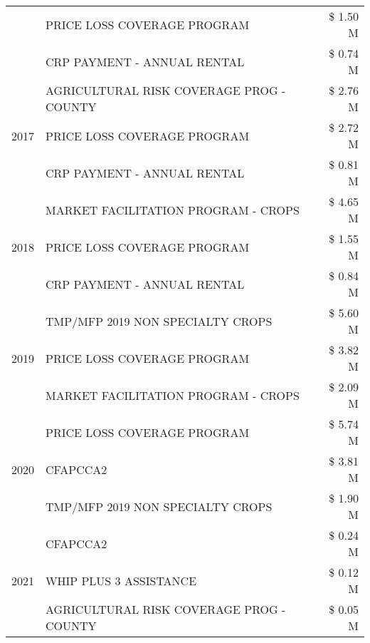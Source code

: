 \begin{tabular}{llr}
 & PRICE LOSS COVERAGE PROGRAM & \$ 1.50 M \\
 & CRP PAYMENT - ANNUAL RENTAL & \$ 0.74 M \\
\cline{1-3}
\multirow[t]{3}{*}{2017} & AGRICULTURAL RISK COVERAGE PROG - COUNTY & \$ 2.76 M \\
 & PRICE LOSS COVERAGE PROGRAM & \$ 2.72 M \\
 & CRP PAYMENT - ANNUAL RENTAL & \$ 0.81 M \\
\cline{1-3}
\multirow[t]{3}{*}{2018} & MARKET FACILITATION PROGRAM - CROPS & \$ 4.65 M \\
 & PRICE LOSS COVERAGE PROGRAM & \$ 1.55 M \\
 & CRP PAYMENT - ANNUAL RENTAL & \$ 0.84 M \\
\cline{1-3}
\multirow[t]{3}{*}{2019} & TMP/MFP 2019 NON SPECIALTY CROPS & \$ 5.60 M \\
 & PRICE LOSS COVERAGE PROGRAM & \$ 3.82 M \\
 & MARKET FACILITATION PROGRAM - CROPS & \$ 2.09 M \\
\cline{1-3}
\multirow[t]{3}{*}{2020} & PRICE LOSS COVERAGE PROGRAM & \$ 5.74 M \\
 & CFAPCCA2 & \$ 3.81 M \\
 & TMP/MFP 2019 NON SPECIALTY CROPS & \$ 1.90 M \\
\cline{1-3}
\multirow[t]{3}{*}{2021} & CFAPCCA2 & \$ 0.24 M \\
 & WHIP PLUS 3 ASSISTANCE & \$ 0.12 M \\
 & AGRICULTURAL RISK COVERAGE PROG - COUNTY & \$ 0.05 M \\
\cline{1-3}
\bottomrule
\end{tabular}
